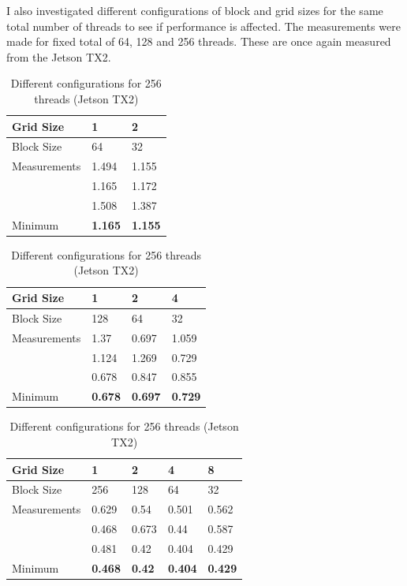\documentclass[12pt]{article}
\begin{document}
I also investigated different configurations of block and grid sizes for the same total number of threads to see if performance is affected. The measurements were made for fixed total of 64, 128 and 256 threads. These are once again measured from the Jetson TX2.

\begin{table}[]
\begin{center}
\begin{tabular}{|l|l|l|}
\hline
Grid Size & 1 & 2 \\ \hline
Block Size & 64 & 32 \\ \hline
Measurements & 1.494 & 1.155 \\ \hline
 & 1.165 & 1.172 \\ \hline
 & 1.508 & 1.387 \\ \hline
Minimum & \textbf{1.165} & \textbf{1.155} \\ \hline
\end{tabular}
\end{center}
\caption{Different configurations for 64 threads (Jetson TX2)}

\begin{center}
\begin{tabular}{|l|l|l|l|}
\hline
Grid Size & 1 & 2 & 4 \\ \hline
Block Size & 128 & 64 & 32 \\ \hline
Measurements & 1.37 & 0.697 & 1.059 \\ \hline
 & 1.124 & 1.269 & 0.729 \\ \hline
 & 0.678 & 0.847 & 0.855 \\ \hline
Minimum & \textbf{0.678} & \textbf{0.697} & \textbf{0.729} \\ \hline
\end{tabular}
\end{center}
\caption{Different configurations for 128 threads (Jetson TX2)}

\begin{center}
\begin{tabular}{|l|l|l|l|l|}
\hline
Grid Size & 1 & 2 & 4 & 8 \\ \hline
Block Size & 256 & 128 & 64 & 32 \\ \hline
Measurements & 0.629 & 0.54 & 0.501 & 0.562 \\ \hline
 & 0.468 & 0.673 & 0.44 & 0.587 \\ \hline
 & 0.481 & 0.42 & 0.404 & 0.429 \\ \hline
Minimum & \textbf{0.468} & \textbf{0.42} & \textbf{0.404} & \textbf{0.429} \\ \hline
\end{tabular}
\end{center}
\caption{Different configurations for 256 threads (Jetson TX2)}
\end{table}
\end{document}

